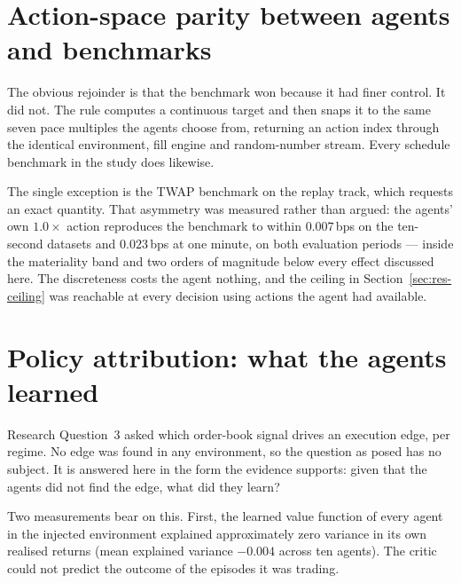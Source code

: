 \section{Action-space parity between agents and benchmarks}\label{sec:res-parity}

The obvious rejoinder is that the benchmark won because it had finer control. It did not.
The rule computes a continuous target and then snaps it to the same seven pace multiples the
agents choose from, returning an action index through the identical environment, fill engine
and random-number stream. Every schedule benchmark in the study does likewise.

The single exception is the TWAP benchmark on the replay track, which requests an exact
quantity. That asymmetry was measured rather than argued: the agents' own $1.0\times$ action
reproduces the benchmark to within $0.007$\,bps on the ten-second datasets and $0.023$\,bps
at one minute, on both evaluation periods --- inside the materiality band and two orders of
magnitude below every effect discussed here. The discreteness costs the agent nothing, and
the ceiling in Section~\ref{sec:res-ceiling} was reachable at every decision using actions
the agent had available.

\section{Policy attribution: what the agents learned}\label{sec:res-learned}


Research Question~3 asked which order-book signal drives an execution edge, per regime. No
edge was found in any environment, so the question as posed has no subject. It is answered
here in the form the evidence supports: given that the agents did not find the edge, what did
they learn?

Two measurements bear on this. First, the learned value function of every agent in the
injected environment explained approximately zero variance in its own realised returns
(mean explained variance $-0.004$ across ten agents). The critic could not predict the
outcome of the episodes it was trading.

